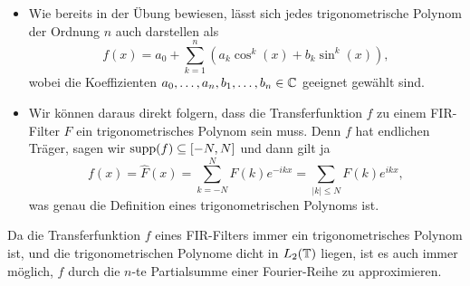 \begin{remark}\leavevmode
\begin{itemize}
\item Wie bereits in der Übung bewiesen, lässt sich jedes trigonometrische Polynom der Ordnung
$ n $ auch darstellen als
\[
  f(x) = a_{0} + \sum_{k = 1}^{n} \left( a_{k}\cos^{k}(x) + b_{k}\sin^{k}(x) \right),
\]
wobei die Koeffizienten $ a_{0}, \ldots, a_{n}, b_{1}, \ldots, b_{n} \in \mathbb{C} $ geeignet gewählt sind.
\item Wir können daraus direkt folgern, dass die Transferfunktion $ f $ zu einem FIR-Filter
$ F $ ein trigonometrisches Polynom sein muss. Denn $ f $ hat endlichen Träger, sagen wir
$ \operatorname{supp}(f) \subseteq [-N, N] $ und dann gilt ja
\[
  f(x) = \widehat{F}(x) = \sum_{k = -N}^{N} F(k) e^{-ikx} = \sum_{|k| \leq N} F(k) e^{ikx},
\]
was genau die Definition eines trigonometrischen Polynoms ist.
\end{itemize}
\end{remark}

\begin{remark}
Da die Transferfunktion $ f $ eines FIR-Filters immer ein trigonometrisches Polynom ist, und die
trigonometrischen Polynome dicht in $ L_{2}(\mathbb{T}) $ liegen, ist es auch immer möglich, $ f $ durch
die $ n $-te Partialsumme einer Fourier-Reihe zu approximieren.
\end{remark}

